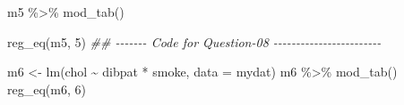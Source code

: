 \documentclass[
  12pt,
  oneside]{article}
\newenvironment{Shaded}{}{}
\newcommand{\AttributeTok}[1]{\textcolor[rgb]{0.49,0.56,0.16}{#1}}
\newcommand{\DecValTok}[1]{\textcolor[rgb]{0.25,0.63,0.44}{#1}}
\newcommand{\DocumentationTok}[1]{\textcolor[rgb]{0.73,0.13,0.13}{\textit{#1}}}
\newcommand{\FunctionTok}[1]{\textcolor[rgb]{0.02,0.16,0.49}{#1}}
\newcommand{\NormalTok}[1]{#1}
\newcommand{\OtherTok}[1]{\textcolor[rgb]{0.00,0.44,0.13}{#1}}
\newcommand{\SpecialCharTok}[1]{\textcolor[rgb]{0.25,0.44,0.63}{#1}}
\begin{document}
\begin{Shaded}
\begin{Highlighting}[]
\NormalTok{m5 }\SpecialCharTok{\%\textgreater{}\%} \FunctionTok{mod\_tab}\NormalTok{()}

\FunctionTok{reg\_eq}\NormalTok{(m5, }\DecValTok{5}\NormalTok{)}
\DocumentationTok{\#\# {-}{-}{-}{-}{-}{-}{-} Code for Question{-}08 {-}{-}{-}{-}{-}{-}{-}{-}{-}{-}{-}{-}{-}{-}{-}{-}{-}{-}{-}{-}{-}{-}{-}{-}}

\NormalTok{m6 }\OtherTok{\textless{}{-}} \FunctionTok{lm}\NormalTok{(chol }\SpecialCharTok{\textasciitilde{}}\NormalTok{ dibpat }\SpecialCharTok{*}\NormalTok{ smoke, }\AttributeTok{data =}\NormalTok{ mydat)}
\NormalTok{m6 }\SpecialCharTok{\%\textgreater{}\%} \FunctionTok{mod\_tab}\NormalTok{()}
\FunctionTok{reg\_eq}\NormalTok{(m6, }\DecValTok{6}\NormalTok{)}
\end{Highlighting}
\end{Shaded}
\end{document}
